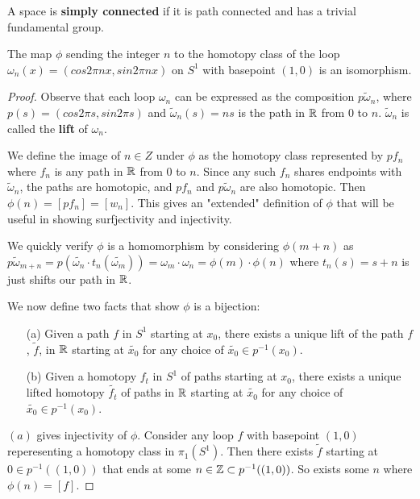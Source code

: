 \documentclass[10pt]{article}
\begin{document}
\begin{definition}
	A space is \textbf{simply connected} if it is path connected and has a trivial fundamental group.
\end{definition}


\begin{theorem}[$\Z \cong \pi_1(S^1)$]

The map $\phi$ sending the integer $n$ to the homotopy class of the loop $\omega_n(x) = (cos2\pi nx, sin2\pi nx)$ on $S^1$ with basepoint $(1, 0)$ is an isomorphism.

\end{theorem}

\begin{proof}

Observe that each loop $\omega_n$ can be expressed as the composition
$p\tilde{\omega}_n$, where $p(s) = (cos2\pi s, sin2\pi s)$ and
$\tilde{\omega}_n(s) = ns$ is the path in $\mathbb{R}$ from $0$ to $n$.
$\tilde{\omega}_n$ is called the \textbf{lift} of $\omega_n$.

We define the image of $n \in Z$ under $\phi$ as the homotopy class represented
by $pf_n$ where $f_n$ is any path in $\mathbb{R}$ from $0$ to $n$. Since any such $f_n$
shares endpoints with $\tilde{\omega}_n$, the paths are homotopic, and $pf_n$
and $p\tilde{\omega}_n$ are also homotopic. Then $\phi(n) = [pf_n] = [w_n]$.
This gives an "extended" definition of $\phi$ that will be useful in showing surfjectivity and injectivity.

We quickly verify $\phi$ is a homomorphism by considering $\phi(m + n)$ as
$p\tilde{\omega}_{m+n} = p(\tilde{\omega_n} \cdot t_n(\tilde{\omega_m})) =
\omega_m \cdot \omega_n = \phi(m) \cdot \phi(n)$ where $t_n(s) = s + n$ is just
shifts our path in $\mathbb{R}$.

We now define two facts that show $\phi$ is a bijection:
\begin{itemize}
	\item[(a)]Given a path $f$ in $S^1$ starting at $x_0$, there exists a unique lift of the path $f$, $\tilde{f}$, in $\mathbb{R}$ starting at $\tilde{x_0}$ for any choice of $\tilde{x_0} \in p^{-1}{(x_0)}$.
	\item[(b)]Given a homotopy $f_t$ in $S^1$ of paths starting at $x_0$, there exists a unique lifted homotopy $\tilde{f_t}$ of paths in $\mathbb{R}$ starting at $\tilde{x_0}$ for any choice of $\tilde{x_0} \in p^{-1}{(x_0)}$.
\end{itemize}

$(a)$ gives injectivity of $\phi$. Consider any loop $f$ with basepoint $(1,
0)$ reperesenting a homotopy class in $\pi_1(S^1)$. Then there exists
$\tilde{f}$ starting at $0 \in p^{-1}((1, 0))$ that ends at some $n \in \mathbb{Z}
\subset p^{-1}((1, 0))$. So exists some $n$ where $\phi(n) = [f]$.


\end{proof}
\end{document}
